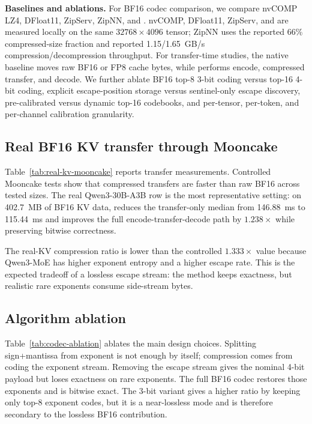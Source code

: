 \textbf{Baselines and ablations.}
For BF16 codec comparison, we compare nvCOMP LZ4, DFloat11, ZipServ, ZipNN, and \splitzip. nvCOMP, DFloat11, ZipServ, and \splitzip are measured locally on the same $32768 \times 4096$ tensor; ZipNN uses the reported 66\% compressed-size fraction and reported 1.15/1.65~GB/s compression/decompression throughput. For transfer-time studies, the native baseline moves raw BF16 or FP8 cache bytes, while \splitzip performs encode, compressed transfer, and decode. We further ablate BF16 top-8 3-bit coding versus top-16 4-bit coding, explicit escape-position storage versus sentinel-only escape discovery, pre-calibrated versus dynamic top-16 codebooks, and per-tensor, per-token, and per-channel calibration granularity.

\subsection{Real BF16 KV transfer through Mooncake}
\label{sec:real-bf16}

Table~\ref{tab:real-kv-mooncake} reports transfer measurements. Controlled Mooncake tests show that compressed transfers are faster than raw BF16 across tested sizes. The real Qwen3-30B-A3B row is the most representative setting: on 402.7~MB of BF16 KV data, \splitzip reduces the transfer-only median from 146.88~ms to 115.44~ms and improves the full encode-transfer-decode path by $1.238\times$ while preserving bitwise correctness.



The real-KV compression ratio is lower than the controlled $1.333\times$ value because Qwen3-MoE has higher exponent entropy and a higher escape rate. This is the expected tradeoff of a lossless escape stream: the method keeps exactness, but realistic rare exponents consume side-stream bytes.

\subsection{Algorithm ablation}
\label{sec:ablation}

Table~\ref{tab:codec-ablation} ablates the main design choices. Splitting sign+mantissa from exponent is not enough by itself; compression comes from coding the exponent stream. Removing the escape stream gives the nominal 4-bit payload but loses exactness on rare exponents. The full BF16 codec restores those exponents and is bitwise exact. The 3-bit variant gives a higher ratio by keeping only top-8 exponent codes, but it is a near-lossless mode and is therefore secondary to the lossless BF16 contribution.

